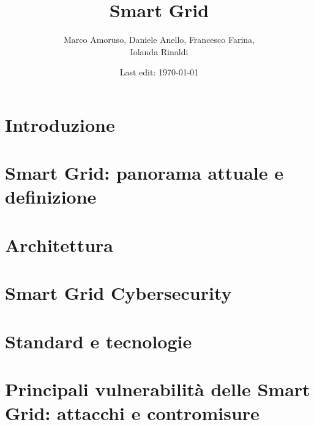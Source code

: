 \documentclass[11pt,oneside]{book}
\title{Smart Grid} %
\author{Marco Amoruso, Daniele Anello, Francesco Farina, \\Iolanda Rinaldi } %
\date{Last edit: \today} %
\newcommand{\initial}[1]{ %
\lettrine[lines=3,lhang=0.3,nindent=0em]{
\color{DarkGoldenrod}
{\textsf{#1}}}{}}
\begin{document}
\maketitle %

\thispagestyle{fancy} %



\tableofcontents
\chapter{Introduzione}

\chapter{Smart Grid: panorama attuale e definizione}

\chapter{Architettura}

\chapter{Smart Grid Cybersecurity}

\chapter{Standard e tecnologie \label{chap:chap5}}

\chapter{Principali vulnerabilità delle Smart Grid: attacchi e contromisure}

\end{document}
